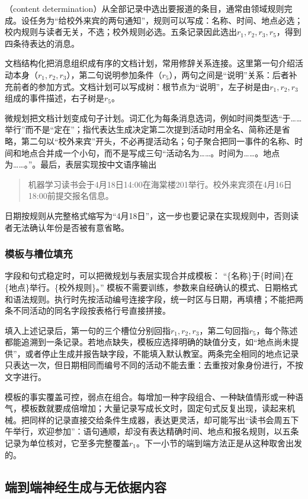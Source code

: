 （content determination）从全部记录中选出要报道的条目，通常由领域规则完成。设任务为“给校外来宾的两句通知”，规则可以写成：名称、时间、地点必选；校内规则与读者无关，不选；校外规则必选。五条记录因此选出$r_1,r_2,r_3,r_5$，得到四条待表达的消息。

文档结构化把消息组织成有序的文档计划，常用修辞关系连接。这里第一句介绍活动本身（$r_1,r_2,r_3$），第二句说明参加条件（$r_5$），两句之间是“说明”关系：后者补充前者的参加方式。文档计划可以写成树：根节点为“说明”，左子树是由$r_1,r_2,r_3$组成的事件描述，右子树是$r_5$。

微规划把文档计划变成句子计划。词汇化为每条消息选词，例如时间类型选“于……举行”而不是“定在”；指代表达生成决定第二次提到活动时用全名、简称还是省略，第二句以“校外来宾”开头，不必再提活动名；句子聚合把同一事件的名称、时间和地点合并成一个小句，而不是写成三句“活动名为……。时间为……。地点为……。”。最后，表层实现按中文语序输出
\begin{quote}
机器学习读书会于4月18日14:00在海棠楼201举行。校外来宾须在4月16日18:00前提交报名信息。
\end{quote}
日期按规则从完整格式缩写为“4月18日”，这一步也要记录在实现规则中，否则读者无法确认年份是否被有意省略。

\subsubsection{模板与槽位填充}
\label{sec:nlp-generation-template}

字段和句式稳定时，可以把微规划与表层实现合并成模板：
“\{名称\}于\{时间\}在\{地点\}举行。\{校外规则\}。”
模板不需要训练，参数来自经确认的模式、日期格式和语法规则。执行时先按活动编号连接字段，统一时区与日期，再填槽；不能把两条不同活动的同名字段按表格行号直接拼接。

填入上述记录后，第一句的三个槽位分别回指$r_1,r_2,r_3$，第二句回指$r_5$，每个陈述都能追溯到一条记录。若地点缺失，模板应选择明确的缺值分支，如“地点尚未提供”，或者停止生成并报告缺字段，不能填入默认教室。两条完全相同的地点记录只表达一次，但日期相同而编号不同的活动不能去重：去重按对象身份进行，不按文字进行。

模板的事实覆盖可控，弱点在组合。每增加一种字段组合、一种缺值情形或一种语气，模板数就要成倍增加；大量记录写成长文时，固定句式反复出现，读起来机械。把同样的记录直接交给条件生成器，表达更灵活，却可能写出“读书会周五下午举行，欢迎参加”：语句通顺，却没有表达精确时间、地点和报名规则，以五条记录为单位核对，它至多完整覆盖$r_1$。下一小节的端到端方法正是从这种取舍出发的。

\subsection{端到端神经生成与无依据内容}
\label{sec:nlp-generation-end-to-end-d2t}

